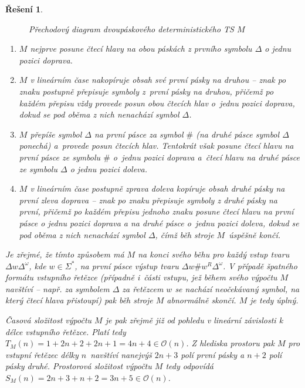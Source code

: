 \documentclass[a4paper]{article}
\let\blank\Delta
\newcommand{\bigO}[1]{\mathcal{O}(#1)}
\theoremstyle{result}
\newtheorem*{result}{Řešení}
\begin{document}
\begin{enumerate}
\begin{result}
\begin{figure}[h]
\begin{tikzpicture}[node distance=20mm, auto]
            \end{tikzpicture}
            \caption{Přechodový diagram dvoupáskového deterministického TS $M$}
        \end{figure}

        \begin{enumerate}[label=\arabic*)]
            \item $M$ nejprve posune čtecí hlavy na obou páskách z prvního symbolu $\blank$ o jednu pozici doprava.
            \item $M$ v lineárním čase nakopíruje obsah své první pásky na druhou -- znak po znaku postupně přepisuje symboly z~první pásky na druhou, přičemž po každém přepisu vždy provede posun obou čtecích hlav o~jednu pozici doprava, dokud se pod oběma z nich nenachází symbol $\blank$.
            \item $M$ přepíše symbol $\blank$ na první pásce za symbol $\#$ (na druhé pásce symbol $\blank$ ponechá) a~provede posun čtecích hlav. Tentokrát však posune čtecí hlavu na první pásce ze symbolu $\#$ o~jednu pozici doprava a~čtecí hlavu na druhé pásce ze symbolu $\blank$ o jednu pozici doleva.
            \item $M$ v lineárním čase postupně zprava doleva kopíruje obsah druhé pásky na první zleva doprava -- znak po znaku přepisuje symboly z druhé pásky na první, přičemž po každém přepisu jednoho znaku posune čtecí hlavu na první pásce o jednu pozici doprava a na druhé pásce o~jednu pozici doleva, dokud se pod oběma z nich nenachází symbol $\blank$, čímž běh stroje $M$~úspěšně končí.
        \end{enumerate}

        Je zřejmé, že tímto způsobem má $M$ na konci svého běhu pro každý vstup tvaru $\blank w\blank^\omega$, kde $w \in \Sigma^*$, na první pásce výstup tvaru $\blank w\#w^R\blank^\omega$. V případě špatného formátu vstupního řetězce (případně i~části vstupu, jež během svého výpočtu $M$ navštíví -- např. za symbolem $\blank$ za řetězcem $w$ se nachází neočekávaný symbol, na který čtecí hlava přistoupí) pak běh stroje $M$ abnormálně skončí. $M$ je tedy úplný.

        Časová složitost výpočtu $M$ je pak zřejmě již od pohledu v lineární závislosti k délce vstupního řetězce. Platí tedy $T_M(n) = 1 + 2n + 2 + 2n + 1 = 4n + 4 \in \bigO{n}$. Z hlediska prostoru pak $M$ pro vstupní řetězec délky $n$~navštíví nanejvýš $2n + 3$ polí první pásky a $n + 2$ polí pásky druhé. Prostorová složitost výpočtu $M$ tedy odpovídá $S_M(n) = 2n + 3 + n + 2 = 3n + 5 \in \bigO{n}$.
    \end{result}
    

\end{enumerate}
\end{document}
